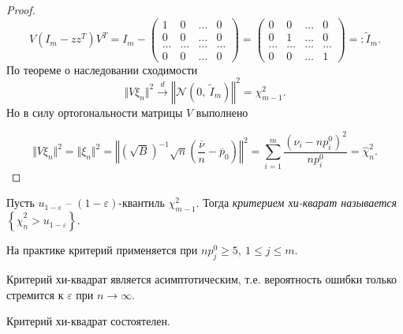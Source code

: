 \begin{proof}
\begin{equation*}
    V\left( I_{m} -zz^{T}\right) V^{T} =I_{m} -\begin{pmatrix}
    1 & 0 & \dotsc  & 0\\
    0 & 0 & \dotsc  & 0\\
    \dotsc  & \dotsc  & \dotsc  & \dotsc \\
    0 & 0 & \dotsc  & 0
    \end{pmatrix} =\begin{pmatrix}
    0 & 0 & \dotsc  & 0\\
    0 & 1 & \dotsc  & 0\\
    \dotsc  & \dotsc  & \dotsc  & \dotsc \\
    0 & 0 & \dotsc  & 1
    \end{pmatrix} =:\tilde{I}_{m} .
    \end{equation*}
    По теореме о наследовании сходимости
    \begin{equation*}
        \Vert V\xi _{n}\Vert ^{2}\xrightarrow{d}\left\Vert \mathcal{N}\left( 0,\ \tilde{I}_{m}\right)\right\Vert ^{2} =\chi _{m-1}^{2} .
    \end{equation*}
    Но в силу ортогональности матрицы $\displaystyle V$ выполнено
    
    
    \begin{equation*}
        \Vert V\xi _{n}\Vert ^{2} =\Vert \xi _{n}\Vert ^{2} =\left\Vert \left(\sqrt{B}\right)^{-1}\sqrt{n}\left(\dfrac{\overline{\nu }}{n} -\overline{p}_{0}\right)\right\Vert ^{2} =\sum _{i=1}^{m}\dfrac{\left( \nu _{i} -np_{i}^{0}\right)^{2}}{np_{i}^{0}} =\hat{\chi }_{n}^{2} .
    \end{equation*}
\end{proof}
\begin{definition}
    Пусть $\displaystyle u_{1-\varepsilon }$ -- $\displaystyle ( 1-\varepsilon )$-квантиль $\displaystyle \chi _{m-1}^{2}$. Тогда \textit{критерием хи-кварат называется} $\displaystyle \left\{\hat{\chi }_{n}^{2}  >u_{1-\varepsilon }\right\}$.
\end{definition}
\begin{note}
    На практике критерий применяется при $\displaystyle np_{j}^{0} \geqslant 5,\ 1\leqslant j\leqslant m$.
\end{note}
\begin{note}
    Критерий хи-квадрат является асимптотическим, т.е. вероятность ошибки только стремится к $\displaystyle \varepsilon $ при $\displaystyle n\rightarrow \infty $.
\end{note}
\begin{proposition}
    Критерий хи-квадрат состоятелен.
\end{proposition}
